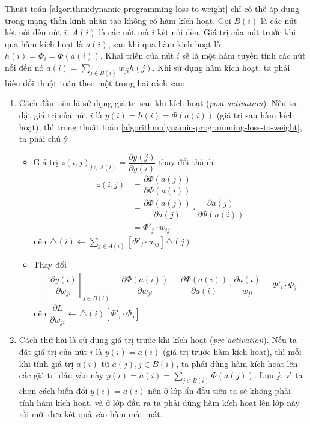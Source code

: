 Thuật toán \ref{algorithm:dynamic-programming-loss-to-weight} chỉ có thể áp dụng trong mạng thần kinh nhân tạo không có hàm kích hoạt. Gọi $B(i)$ là các nút kết nối đến nút $i$, $A(i)$ là các nút mà $i$ kết nối đến. Giá trị của nút trước khi qua hàm kích hoạt là $a(i)$, sau khi qua hàm kich hoạt là $h(i)=\Phi_i=\Phi(a(i))$. Khai triển của nút $i$ sẽ là một hàm tuyến tính các nút nối đến nó $a(i)=\sum_{j\in B(i)}w_{ji}h(j)$. Khi sử dụng hàm kích hoạt, ta phải biến đổi thuật toán theo một trong hai cách sau:
\begin{enumerate}
    \item Cách đầu tiên là sử dụng giá trị sau khi kích hoạt (\textit{post-activation}). Nếu ta đặt giá trị của nút $i$ là $y(i)=h(i)=\Phi(a(i))$ (giá trị sau hàm kích hoạt), thì trong thuật toán \ref{algorithm:dynamic-programming-loss-to-weight}, ta phải chú ý
          \begin{itemize}
              \item Giá trị $z(i,j)_{j\in A(i)}=\dfrac{\partial y(j)}{\partial y(i)}$ thay đổi thành
                    \begin{align}
                        z(i,j)
                         & =\dfrac{\partial\Phi(a(j))}{\partial\Phi(a(i))}                                          \nonumber \\
                         & =\dfrac{\partial\Phi(a(j))}{\partial a(j)}\cdot\dfrac{\partial a(j)}{\partial\Phi(a(i))} \nonumber \\
                         & =\Phi'_j\cdot w_{ij}
                    \end{align}
                    nên $\triangle(i)\gets\sum_{j\in A(i)}\left[\Phi'_j\cdot w_{ij}\right]\triangle(j)$
              \item Thay đổi
                    \begin{align}
                        \left[\dfrac{\partial y(i)}{\partial w_{ji}}\right]_{j\in B(i)}=\dfrac{\partial\Phi(a(i))}{\partial w_{ji}}=\dfrac{\partial\Phi(a(i))}{\partial a(i)}\cdot\dfrac{\partial a(i)}{w_{ji}}=\Phi'_i\cdot\Phi_j
                    \end{align}
                    nên $\dfrac{\partial L}{\partial w_{ji}}\gets\triangle(i)\left[\Phi'_i\cdot\Phi_j\right]$
          \end{itemize}
    \item Cách thứ hai là sử dụng giá trị trước khi kích hoạt (\textit{pre-activation}). Nếu ta đặt giá trị của nút $i$ là $y(i)=a(i)$ (giá trị trước hàm kích hoạt), thì mỗi khi tính giá trị $a(i)$ từ $a(j),j\in B(i)$, ta phải dùng hàm kích hoạt lên các giá trị đầu vào này $y(i)=a(i)=\sum_{j\in B(i)}\Phi(a(j))$. Lưu ý, vì ta chọn cách biến đổi $y(i)=a(i)$ nên ở lớp ẩn đầu tiên ta sẽ không phải tính hàm kích hoạt, và ở lớp đầu ra ta phải dùng hàm kích hoạt lên lớp này rồi mới đưa kết quả vào hàm mất mát.

\end{enumerate}
